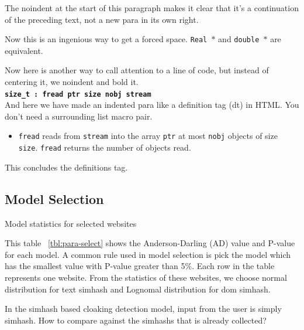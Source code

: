 \noindent
The noindent at the start of this paragraph makes it clear that it's
a continuation of the preceding text, not a new para in its own right.


Now this is an ingenious way to get a forced space.
{\tt Real~$*$} and {\tt double~$*$} are equivalent. 

Now here is another way to call attention to a line of code, but instead
of centering it, we noindent and bold it.\\

\noindent
{\bf \tt size\_t : fread ptr size nobj stream } \\

And here we have made an indented para like a definition tag (dt)
in HTML.  You don't need a surrounding list macro pair.
\begin{itemize}
  \item[]  {\tt fread} reads from {\tt stream} into the array {\tt ptr} at
    most {\tt nobj} objects of size {\tt size}.   {\tt fread} returns
    the number of objects read. 
\end{itemize}
This concludes the definitions tag.

\subsection{Model Selection}


\begin{table}[!th]                                                     
  \centering                                                            
  \scriptsize                                                           
                                       
  \caption{Model statistics for selected websites}
  \label{tbl:para-select}                                         
\end{table}                                                            


This table ~\autoref{tbl:para-select} shows the Anderson-Darling (AD) value and P-value for each model.
A common rule used in model selection is pick the model which has the smallest
value with P-value greater than 5\%. Each row in the table represents one
website. From the statistics of these websites, we choose normal distribution
for text simhash and Lognomal distribution for dom simhash.

In the simhash based cloaking detection model, input from the user is simply simhash. How to compare against the simhashs that is already collected?

